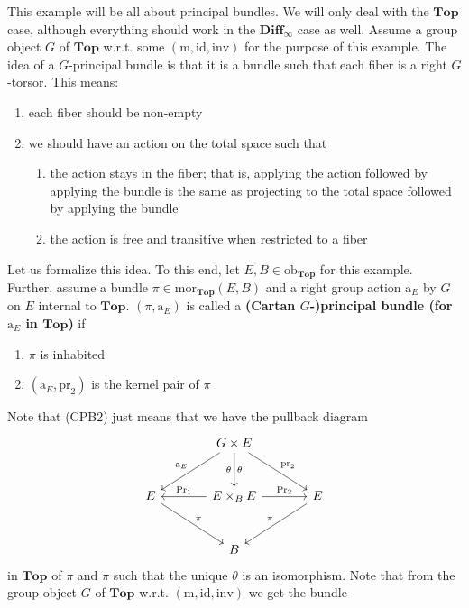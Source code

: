 \begin{exa}[Bundles 2]
\label{exa:bundles2}
This example will be all about principal bundles.
We will only deal with the $\mathbf{Top}$ case, although everything should work in the $\mathbf{Diff}_{\infty}$ case as well.
Assume a group object $G$ of $\mathbf{Top}$ w.r.t. some $(\mathrm{m},\mathrm{id},\mathrm{inv})$ for the purpose of this example.
The idea of a $G$-principal bundle is that it is a bundle such that each fiber is a right $G$-torsor.
This means:
\begin{enumerate}
\item[(1)]
each fiber should be non-empty
\item[(2)]
we should have an action on the total space such that
\begin{enumerate}
\item[$\bullet$]
the action stays in the fiber; that is, applying the action followed by applying the bundle is the same as projecting to the total space followed by applying the bundle
\item[$\bullet$]
the action is free and transitive when restricted to a fiber
\end{enumerate}
\end{enumerate}
Let us formalize this idea.
To this end, let $E,B \in \mathrm{ob}_{\mathbf{Top}}$ for this example.
Further, assume a bundle $\pi \in \mathrm{mor}_{\mathbf{Top}}(E,B)$ and a right group action $\mathrm{a}_{E}$ by $G$ on $E$ internal to $\mathbf{Top}$.
$(\pi,\mathrm{a}_{E})$ is called a \textbf{(Cartan $G$-)principal bundle (for $\mathrm{a}_{E}$ in $\mathbf{Top}$)} if
\begin{enumerate}
\item[(CPB1)]
$\pi$ is inhabited
\item[(CPB2)]
$(\mathrm{a}_{E},\mathrm{pr}_{2})$ is the kernel pair of $\pi$
\end{enumerate}
Note that (CPB2) just means that we have the pullback diagram
\[
\begin{tikzcd}[sep=large]
  &
  G
  \times
  E
  \arrow{dr}{\mathrm{pr}_{2}}
  \arrow{d}{\theta}
  \arrow[swap]{d}{\theta}
  \arrow[swap]{dl}{\mathrm{a}_{E}}
  &
  \\
  E
  \arrow{dr}{\pi}
  &
  E
  \times_{B}
  E
  \arrow{r}{\mathrm{Pr}_{2}}
  \arrow[swap]{l}{\mathrm{Pr}_{1}}
  &
  E
  \arrow[swap]{dl}{\pi}
  \\
  &
  B
  &
\end{tikzcd}
\]
in $\mathbf{Top}$ of $\pi$ and $\pi$ such that the unique $\theta$ is an isomorphism.
Note that from the group object $G$ of $\mathbf{Top}$ w.r.t. $(\mathrm{m},\mathrm{id},\mathrm{inv})$ we get the bundle

\end{exa}
